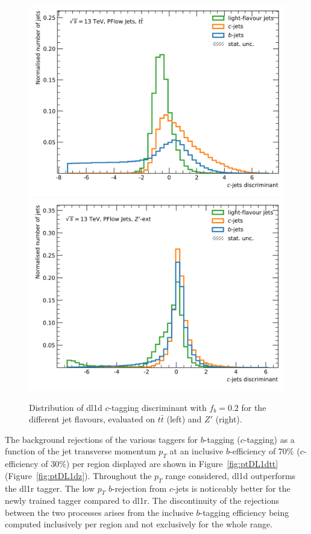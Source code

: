 \begin{center}
\begin{figure}[h!]
{  \includegraphics[scale=0.5]{Images/FTAG/DL1d/ROC/scores_DL1_ttbar_c_299.png}
  \includegraphics[scale=0.5]{Images/FTAG/DL1d/ROC/scores_DL1_zp_c_299.png}
  }
  \caption{Distribution of \gls{dl1d} $c$-tagging discriminant with $f_b = 0.2$ for the different jet flavours, evaluated on $t\bar{t}$ (left) and $Z'$ (right).}
  \label{fig:scoreDL1dz}
  \end{figure}
\end{center}

The background rejections of the various taggers for $b$-tagging ($c$-tagging) as a function of the jet transverse momentum $p_T$ at an inclusive $b$-efficiency of 70\% ($c$-efficiency of 30\%) per region displayed are shown in Figure~\ref{fig:ptDL1dtt} (Figure~\ref{fig:ptDL1dz}). Throughout the $p_T$ range considered, \gls{dl1d} outperforms the \gls{dl1r} tagger. The low $p_T$ $b$-rejection from $c$-jets is noticeably better for the newly trained tagger compared to \gls{dl1r}. The discontinuity of the rejections between the two processes arises from the inclusive $b$-tagging efficiency being computed inclusively per region and not exclusively for the whole range.

